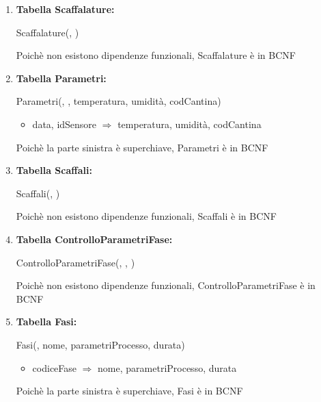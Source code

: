 \documentclass[12pt,a4paper]{article}
\begin{document}
\begin{enumerate}
\item[] \textbf{Tabella Scaffalature:}

Scaffalature(\underline{}, \underline{})

Poichè non esistono dipendenze funzionali, Scaffalature è in BCNF
\vspace{10pt}



\item[] \textbf{Tabella Parametri:}

Parametri(\underline{}, \underline{}, temperatura, umidità,  codCantina)
\begin{itemize}
\vspace{-5pt}
\item data, idSensore $\Rightarrow$ temperatura, umidità, codCantina
\vspace{-5pt}
\end{itemize}
Poichè la parte sinistra è superchiave, Parametri è in BCNF
\vspace{10pt}



\item[] \textbf{Tabella Scaffali:}

Scaffali(\underline{}, \underline{})

Poichè non esistono dipendenze funzionali, Scaffali è in BCNF
\vspace{10pt}



\item[] \textbf{Tabella ControlloParametriFase:}

ControlloParametriFase(\underline{}, \underline{}, \underline{})

Poichè non esistono dipendenze funzionali, ControlloParametriFase è in BCNF
\vspace{10pt}



\item[] \textbf{Tabella Fasi:}

Fasi(\underline{}, nome, parametriProcesso, durata)
\begin{itemize}
\vspace{-5pt}
\item codiceFase $\Rightarrow$ nome, parametriProcesso, durata
\vspace{-5pt}
\end{itemize}
Poichè la parte sinistra è superchiave, Fasi è in BCNF
\vspace{10pt}




\end{enumerate}
\end{document}
